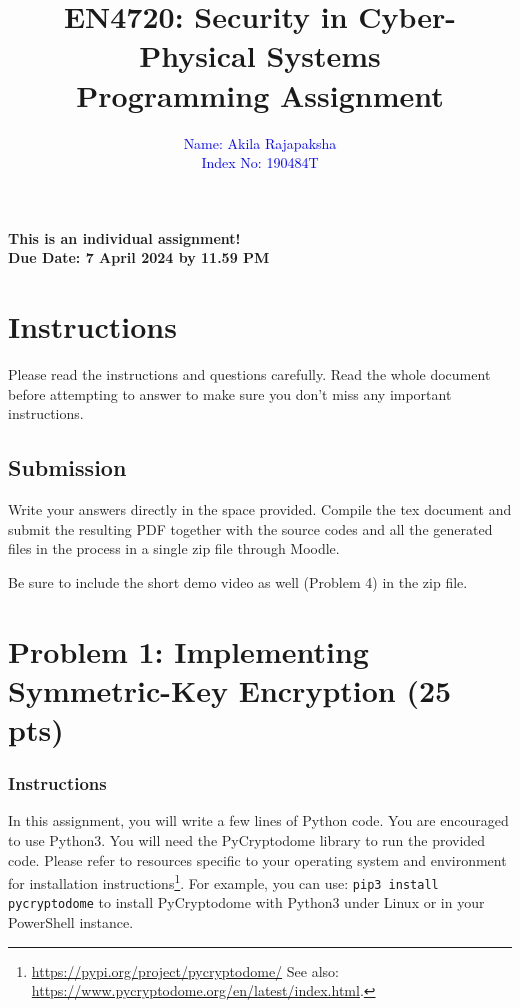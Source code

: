\documentclass[11pt,letterpaper]{article}
\begin{document}
\title{EN4720: Security in Cyber-Physical Systems \\ Programming Assignment}

\author{ \textcolor{blue}{Name: Akila Rajapaksha} \\ \textcolor{blue}{Index No: 190484T}}

\maketitle

\begin{center}
	\color{red}\bf This is an individual assignment! \\ Due Date: 7 April 2024 by 11.59 PM
\end{center}

\section*{Instructions}
%

Please read the instructions and questions carefully. Read the whole document before attempting to answer to make sure you don't miss any important instructions. 

\subsection*{Submission}
Write your answers directly in the space provided. Compile the tex document and submit the resulting PDF together with the source codes and all the generated files in the process in a single zip file through Moodle.

\medskip
\noindent Be sure to include the short demo video as well (Problem 4) in the zip file.


\newpage
\section*{Problem 1: Implementing Symmetric-Key Encryption ({25 pts})}
%

\subsubsection*{Instructions}
%

\noindent In this assignment, you will write a few lines of Python code. You are encouraged to use Python3. You will need the PyCryptodome library to run the provided code. Please refer to resources specific to your operating system and environment for installation instructions\footnote{\url{https://pypi.org/project/pycryptodome/} See also:  \url{https://www.pycryptodome.org/en/latest/index.html}.}. For example, you can use: \texttt{pip3 install pycryptodome} to install PyCryptodome with Python3 under Linux or in your PowerShell instance. 
\end{document}

